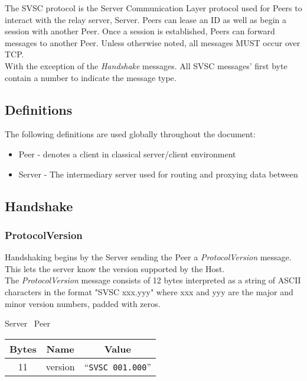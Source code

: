 \documentclass{article}
\begin{document}
    The SVSC protocol is the Server Communication Layer protocol used for Peers to interact with the relay server,
    Server. Peers can lease an ID as well as begin a session with another Peer. Once a session is established, Peers can
    forward messages to another Peer. Unless otherwise noted, all messages MUST occur over TCP.\\

    With the exception of the \emph{Handshake} messages. All SVSC messages' first byte contain a number to indicate
    the message type.

    \subsection{Definitions}
    The following definitions are used globally throughout the document:

    \begin{itemize}
        \item Peer - denotes a client in classical server/client environment
        \item Server - The intermediary server used for routing and proxying data between
    \end{itemize}

    \subsection{Handshake}

    \subsubsection{ProtocolVersion}

    Handshaking begins by the Server sending the Peer a \emph{ProtocolVersion} message. This lets the server know
    the version supported by the Host.\\

    The \emph{ProtocolVersion} message consists of 12 bytes interpreted as a string of ASCII characters in the format
    "SVSC xxx.yyy" where xxx and yyy are the major and minor version numbers, padded with zeros.

    \begin{center}
        Server \textrightarrow\ Peer\\
        \begin{tabular}{|c|c|c|}
            \hline
            \textbf{Bytes} & \textbf{Name} & \textbf{Value}            \\
            \hline
            11             & version       & ``\texttt{SVSC 001.000}'' \\
            \hline
        \end{tabular}
    \end{center}
\end{document}
